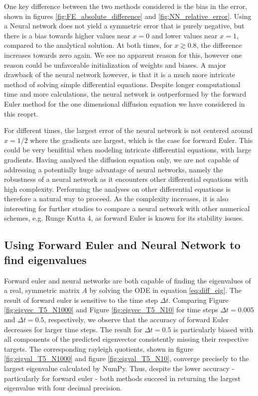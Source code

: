 \documentclass[12pt]{extarticle}
\begin{document}
One key difference between the two methods considered is the bias in the error, shown in figures \ref{fig:FE_absolute_difference} and \ref{fig:NN_relative_error}. Using a Neural network does not yield a symmetric error that is purely negative, but there is a bias towards higher values near $x=0$ and lower values near $x=1$, compared to the analytical solution. At both times, for $x\gtrsim0.8$, the difference increases towards zero again. We see no apparent reason for this, however one reason could be unfavorable initialization of weights and biases. A major drawback of the neural network however, is that it is a much more intricate method of solving simple differential equations. Despite longer computational time and more calculations, the neural network is outperformed by the forward Euler method for the one dimensional diffusion equation we have considered in this reoprt.  

For different times, the largest error of the neural network is not centered around $x=1/2$ where the gradients are largest, which is the case for forward Euler. This could be very benifitial when modeling intricate differential equations, with large gradients. Having analysed the diffusion equation only, we are not capable of addressing a potentially huge advantage of neural networks, namely the robustness of a neural network as it encounters other differential equations with high complexity. Performing the analyses on other differential equations is therefore a natural way to proceed. As the complexity increases, it is also interesting for further studies to compare a neural network with other numerical schemes, e.g. Runge Kutta 4, as forward Euler is known for its stability issues.   


\subsection{Using Forward Euler and Neural Network to find eigenvalues}

Forward euler and neural networks are both capable of finding the eigenvalues of a real, symmetric matrix $A$ by solving the ODE in equation \eqref{eq:diff_eig}. The result of forward euler is sensitive to the time step $\Delta t$. Comparing Figure \ref{fig:eigvec_T5_N1000} and Figure \ref{fig:eigvec_T5_N10} for time steps $\Delta t = 0.005$ and $\Delta t = 0.5$, respectively, we observe that the accuracy of forward Euler decreases for larger time steps. The result for $\Delta t=0.5$ is particularly biased with all components of the predicted eigenvector consistently missing their respective targets. The corresponding rayleigh quotients, shown in figure \ref{fig:eigval_T5_N1000} and figure \ref{fig:eigval_T5_N10}, converge precisely to the largest eigenvalue calculated by NumPy. Thus, despite the lower accuracy - particularly for forward euler - both methods succeed in returning the largest eigenvalue with four decimal precision.
\end{document}
